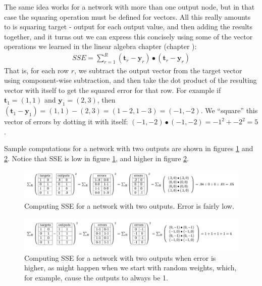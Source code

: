 The same idea works  for a network with more than one output node, but in that case the squaring operation must be defined for vectors. All this really amounts to is squaring target - output for each output value, and then adding the results together, and it turns out we can express this concisely using some of the vector operations we learned in the linear algebra chapter (chapter ): 
\begin{eqnarray*}
SSE =  \sum_{r=1}^{R}(\mathbf{t}_r - \mathbf{y}_r) \bullet (\mathbf{t}_r - \mathbf{y}_r) 
\end{eqnarray*}
That is, for each row $r$, we subtract the output vector from the target vector using component-wise subtraction, and then take the dot product of the resulting vector with itself to get the squared error for that row. For example if $\mathbf{t}_1 = (1,1)$ and $\mathbf{y}_1 = (2,3)$, then  $(\mathbf{t}_1 - \mathbf{y}_1) = (1,1) - (2,3) = (1-2,1-3) = (-1,-2)$. We ``square'' this vector of errors by dotting it with itself: $(-1,-2) \bullet (-1,-2) = -1^2 + -2^2 = 5$. 

Sample computations for a network with two outputs are shown in figures \ref{error_computation2_low} and \ref{error_computation2_high}.  Notice that SSE is low in figure \ref{error_computation2_low}, and higher in figure \ref{error_computation2_high}. 

\begin{figure}[h]
\centering
\includegraphics[scale=.5]{./images/ErrorComputation_2_low.png}
\caption[Jeff Yoshimi.]{Computing SSE for a network with two outputs. Error is fairly low.}
\label{error_computation2_low}
\end{figure}

\begin{figure}[h]
\centering
\includegraphics[scale=.5]{./images/ErrorComputation_2_high.png}
\caption[Jeff Yoshimi.]{Computing SSE for a network with two outputs when error is higher, as might happen when we start with random weights, which, for example, cause the outputs to always be 1.}
\label{error_computation2_high}
\end{figure}

